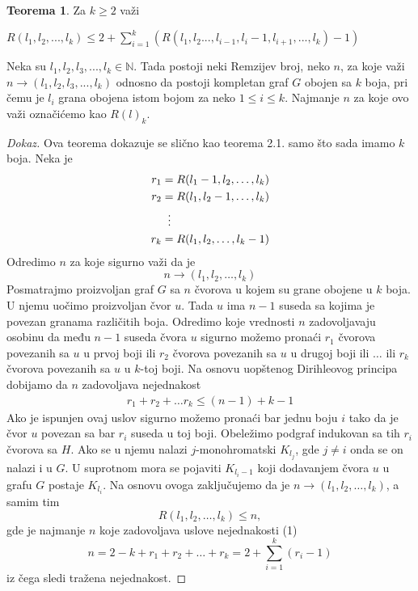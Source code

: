 \documentclass{article}
\theoremstyle{definition}
\newtheorem{teorema}{Teorema}[section]
\newcommand{\dokaz}[1]{\begin{proof}[Dokaz]#1\end{proof}}
\begin{document}
	\begin{teorema}
		Za $k \geq 2$ važi \newline
		
		$ R(l_1, l_2, ... , l_k) \leq 2 + \sum\limits_{i=1}^{k}(R(l_1, l_2 ... , l_{i-1}, l_i-1, l_{i+1}, ... , l_k)-1) $
	\end{teorema}
	
	
	Neka su $l_1, l_2, l_3, ... , l_k \in \mathbb{N}$. Tada postoji neki Remzijev broj, neko $n$, za koje važi $n \rightarrow (l_1, l_2, l_3, ... , l_k)$ odnosno da postoji kompletan graf $G$ obojen sa $k$ boja, pri čemu je $l_i$ grana obojena istom bojom za neko $1 \leq i \leq k$. Najmanje $n$ za koje ovo važi označićemo kao $R(l)_k$. 
	
	\dokaz{
		Ova teorema dokazuje se slično kao teorema 2.1. samo što sada imamo $k$ boja. Neka je
		\begin{align*}
		r_1 &= R(l_1 - 1, l_2, \dots, l_k) \\
		r_2 &= R(l_1, l_2 - 1, \dots, l_k) \\
		&\;\;\vdots \notag \\
		r_k &= R(l_1, l_2, \dots, l_k - 1) \\
		\end{align*}
		Odredimo $n$ za koje sigurno važi da je 
		$$n \rightarrow (l_1, l_2, \dots, l_k)$$
		Posmatrajmo proizvoljan graf $G$ sa $n$ čvorova u kojem su grane obojene u $k$ boja.
		U njemu uočimo proizvoljan čvor $u$. Tada $u$ ima $n - 1$ 
		suseda sa kojima je povezan granama različitih boja. Odredimo koje vrednosti $n$ zadovoljavaju osobinu da među $n - 1$ suseda čvora $u$ sigurno
		možemo pronaći $r_1$ čvorova povezanih sa $u$ u prvoj boji ili $r_2$ čvorova povezanih sa $u$ u drugoj boji ili $\dots$ ili $r_k$ čvorova povezanih sa 		$u$ u $k$-toj boji. Na osnovu uopštenog Dirihleovog principa dobijamo da $n$ zadovoljava nejednakost
		\begin{align} r_1 + r_2 + \dots r_k \leq (n - 1) + k - 1 \end{align}
		Ako je ispunjen ovaj uslov sigurno možemo pronaći bar jednu boju $i$ tako da je čvor $u$ povezan sa bar $r_i$ suseda u toj boji. Obeležimo podgraf
		indukovan sa tih $r_i$ čvorova sa $H$. Ako se u njemu nalazi $j$-monohromatski $K_{l_j}$, gde $j \neq i$ onda se on nalazi i u $G$. U suprotnom mora          
		se pojaviti $K_{l_i - 1}$ koji dodavanjem čvora $u$ u grafu $G$ postaje $K_{l_i}$. Na osnovu ovoga zaključujemo da je 
		$n \rightarrow (l_1, l_2, \dots, l_k)$, a samim tim \newline
		$$R(l_1, l_2, \dots, l_k) \leq n,$$ gde je najmanje $n$ koje zadovoljava uslove nejednakosti (1)
		$$n = 2 - k + r_1 + r_2 + \dots + r_k = 2 + \sum_{i = 1}^{k} (r_i - 1)$$
		iz čega sledi tražena nejednakost.
		
	}
	
\end{document}

